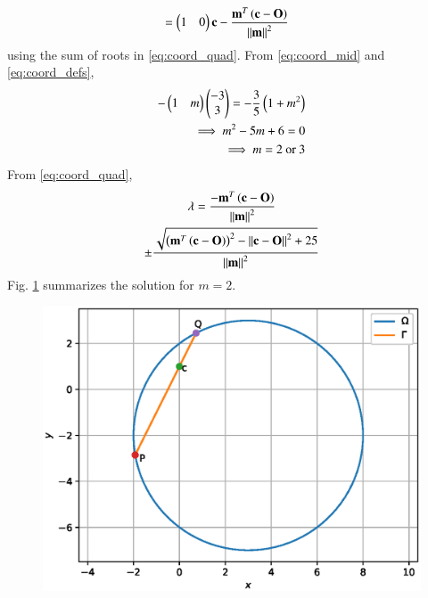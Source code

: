 \documentclass[journal,12pt,twocolumn]{IEEEtran}
\renewcommand\thesection{\arabic{section}}
\begin{document}
\begin{enumerate}[label=\thesection.\arabic*
,ref=\thesection.\theenumi]
\begin{align}
\\
&= \begin{pmatrix}1 & 0\end{pmatrix}\mathbf{c} -
\frac{\mathbf{m}^{T}\left(\mathbf{c} -\mathbf{O}\right)}{\left\Vert\mathbf{m}\right\Vert^2}
\end{align}
using the sum of roots in \eqref{eq:coord_quad}.  From 
\eqref{eq:coord_mid} and \eqref{eq:coord_defs},
\begin{align}
-\begin{pmatrix}1 & m\end{pmatrix}\begin{pmatrix}-3\\3\end{pmatrix}= -\frac{3}{5}\left(1+m^2\right)
\\
\implies m^2 -5m + 6 = 0
\\
\implies m = 2 \text{ or } 3
\end{align}
From \eqref{eq:coord_quad}, 
\begin{multline}
\lambda = \frac{-\mathbf{m}^{T}\left(\mathbf{c} -\mathbf{O}\right)}{{\left\Vert\mathbf{m}\right\Vert^2}}
\\
\pm \frac{\sqrt{\left(\mathbf{m}^{T}\left(\mathbf{c} -\mathbf{O}\right)\right)^2
-\left\Vert\mathbf{c} -\mathbf{O}\right\Vert^2+25}}{\left\Vert\mathbf{m}\right\Vert^2}
\end{multline}
Fig. \ref{fig:2019_3} summarizes the solution for $m = 2$.


\begin{figure}
\centering
\includegraphics[width=\columnwidth]{./figs/2019_3.eps}
\caption{}
\label{fig:2019_3}
\end{figure}
\end{enumerate}
\end{document}
